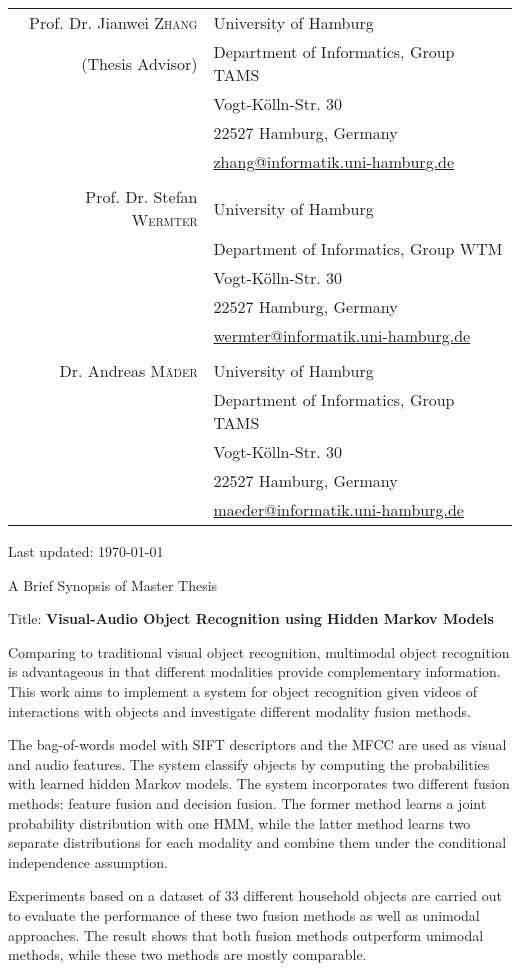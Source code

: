\documentclass[a4paper,11pt]{article} %
\begin{document}
\begin{tabular}{rl}
 Prof. Dr. Jianwei \textsc{Zhang} & University of Hamburg \\
 \footnotesize{(Thesis Advisor)} & Department of Informatics, Group TAMS \\
   & Vogt-Kölln-Str. 30 \\
   & 22527 Hamburg, Germany \\
   & \href{mailto:zhang@informatik.uni-hamburg.de}{zhang@informatik.uni-hamburg.de} \\
   \\
 Prof. Dr. Stefan \textsc{Wermter} & University of Hamburg \\
   & Department of Informatics, Group WTM\\
   & Vogt-Kölln-Str. 30 \\
   & 22527 Hamburg, Germany \\
   & \href{mailto:wermter@informatik.uni-hamburg.de}{wermter@informatik.uni-hamburg.de} \\
   \\
 Dr. Andreas \textsc{M\"ader} & University of Hamburg \\
   & Department of Informatics, Group TAMS\\
   & Vogt-Kölln-Str. 30 \\
   & 22527 Hamburg, Germany \\
   & \href{mailto:maeder@informatik.uni-hamburg.de}{maeder@informatik.uni-hamburg.de} \\
\end{tabular}
\fi

\vspace{.5cm}
\par{\centering \scriptsize Last updated: \today \par}

\newpage

\par{\centering \Large \hypertarget{synopsis}{A Brief Synopsis of Master Thesis}\par}

Title: \textbf{Visual-Audio Object Recognition using Hidden Markov Models}

Comparing to traditional visual object recognition, multimodal object recognition is advantageous in that different modalities provide complementary information. This work aims to implement a system for object recognition given videos of interactions with objects and investigate different modality fusion methods.

The bag-of-words model with SIFT descriptors and the MFCC are used as visual and audio features. The system classify objects by computing the probabilities with learned hidden Markov models. The system incorporates two different fusion methods: feature fusion and decision fusion. The former method learns a joint probability distribution with one HMM, while the latter method learns two separate distributions for each modality and combine them under the conditional independence assumption.

Experiments based on a dataset of 33 different household objects are carried out to evaluate the performance of these two fusion methods as well as unimodal approaches. The result shows that both fusion methods outperform unimodal methods, while these two methods are mostly comparable. 
 
\end{document}
